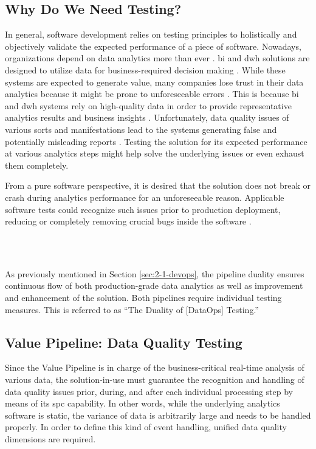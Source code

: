 \subsection{Why Do We Need Testing?}
In general, software development relies on testing principles to holistically and objectively validate the expected performance of a piece of software. Nowadays, organizations depend on data analytics more than ever \cite{Munawar2011}. \ac{bi} and \ac{dwh} solutions are designed to utilize data for business-required decision making \cite{Souibgui2019}. While these systems are expected to generate value, many companies lose trust in their data analytics because it might be prone to unforeseeable errors \cite{BISurvey.com}. This is because \ac{bi} and \ac{dwh} systems rely on high-quality data in order to provide representative analytics results and business insights \cite{Munawar2011}. Unfortunately, data quality issues of various sorts and manifestations lead to the systems generating false and potentially misleading reports \cite{Munawar2011}\cite{Freudiger2014}\cite{Redman2016}. Testing the solution for its expected performance at various analytics steps might help solve the underlying issues or even exhaust them completely. 

From a pure software perspective, it is desired that the solution does not break or crash during analytics performance for an unforeseeable reason. Applicable software tests could recognize such issues prior to production deployment, reducing or completely removing crucial bugs inside the software \cite[105\psqq]{ORegan2017}.

\\\

As previously mentioned in Section \ref{sec:2-1-devops}, the pipeline duality ensures continuous flow of both production-grade data analytics as well as improvement and enhancement of the solution. Both pipelines require individual testing measures. This is referred to as \enquote{The Duality of [DataOps] Testing.} \cite[40\sqq]{Bergh2019}

\subsection{Value Pipeline: Data Quality Testing}
Since the Value Pipeline is in charge of the business-critical real-time analysis of various data, the solution-in-use must guarantee the recognition and handling of data quality issues prior, during, and after each individual processing step by means of its \ac{spc} capability. In other words, while the underlying analytics software is static, the variance of data is arbitrarily large and needs to be handled properly. In order to define this kind of event handling, unified data quality dimensions are required.

